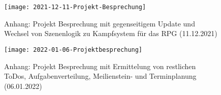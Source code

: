 \begin{figure}[H]
    \centering
    \caption{Anhang: Projekt Besprechung mit gegenseitigem Update und Wechsel von Szenenlogik zu Kampfsystem für das RPG (11.12.2021) }
    \label{fig:2021-12-11-Projekt-Besprechung}
    \texttt{[image: 2021-12-11-Projekt-Besprechung]}
\end{figure}


\begin{figure}[H]
    \centering
    \caption{Anhang: Projekt Besprechung mit Ermittelung von restlichen ToDos, Aufgabenverteilung, Meilienstein- und Terminplanung (06.01.2022)}
    \label{fig:2022-01-06-Projektbesprechung}
    \texttt{[image: 2022-01-06-Projektbesprechung]}
\end{figure}

